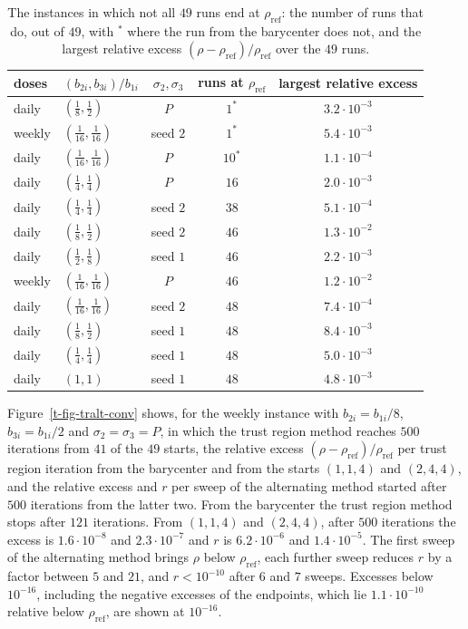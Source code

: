 \documentclass[11pt]{article}
\theoremstyle{plain}
\theoremstyle{definition}
\theoremstyle{remark}
\numberwithin{equation}{section}
\numberwithin{figure}{section}
\numberwithin{table}{section}
\numberwithin{algorithm}{section}
\begin{document}
\begin{table}[ht]
\centering
\small
\begin{tabular}{llccc}
\hline
doses & $(b_{2i},b_{3i})/b_{1i}$ & $\sigma_2,\sigma_3$ & runs at $\rho_{\mathrm{ref}}$ & largest relative excess\\
\hline
daily  & $(\tfrac18,\tfrac12)$       & $P$      & $1^*$  & $3.2\cdot 10^{-3}$\\
weekly & $(\tfrac1{16},\tfrac1{16})$ & seed $2$ & $1^*$  & $5.4\cdot 10^{-3}$\\
daily  & $(\tfrac1{16},\tfrac1{16})$ & $P$      & $10^*$ & $1.1\cdot 10^{-4}$\\
daily  & $(\tfrac14,\tfrac14)$       & $P$      & $16$   & $2.0\cdot 10^{-3}$\\
daily  & $(\tfrac14,\tfrac14)$       & seed $2$ & $38$   & $5.1\cdot 10^{-4}$\\
daily  & $(\tfrac18,\tfrac12)$       & seed $2$ & $46$   & $1.3\cdot 10^{-2}$\\
daily  & $(\tfrac12,\tfrac18)$       & seed $1$ & $46$   & $2.2\cdot 10^{-3}$\\
weekly & $(\tfrac1{16},\tfrac1{16})$ & $P$      & $46$   & $1.2\cdot 10^{-2}$\\
daily  & $(\tfrac1{16},\tfrac1{16})$ & seed $2$ & $48$   & $7.4\cdot 10^{-4}$\\
daily  & $(\tfrac18,\tfrac12)$       & seed $1$ & $48$   & $8.4\cdot 10^{-3}$\\
daily  & $(\tfrac14,\tfrac14)$       & seed $1$ & $48$   & $5.0\cdot 10^{-3}$\\
daily  & $(1,1)$                     & seed $1$ & $48$   & $4.8\cdot 10^{-3}$\\
\hline
\end{tabular}
\caption{The instances in which not all $49$ runs end at $\rho_{\mathrm{ref}}$:
the number of runs that do, out of $49$, with $^*$ where the run from the
barycenter does not, and the largest relative excess
$(\rho-\rho_{\mathrm{ref}})/\rho_{\mathrm{ref}}$ over the $49$
runs.}\label{t-tab-tralt-miss}
\end{table}

Figure~\ref{t-fig-tralt-conv} shows, for the weekly instance with
$b_{2i}=b_{1i}/8$, $b_{3i}=b_{1i}/2$ and $\sigma_2=\sigma_3=P$, in which the
trust region method reaches $500$ iterations from $41$ of the $49$ starts, the
relative excess $(\rho-\rho_{\mathrm{ref}})/\rho_{\mathrm{ref}}$ per trust
region iteration from the barycenter and from the starts $(1,1,4)$ and
$(2,4,4)$, and the relative excess and $r$ per sweep of the alternating method
started after $500$ iterations from the latter two. From the barycenter the
trust region method stops after $121$ iterations. From $(1,1,4)$ and $(2,4,4)$,
after $500$ iterations the excess is $1.6\cdot 10^{-8}$ and $2.3\cdot 10^{-7}$
and $r$ is $6.2\cdot 10^{-6}$ and $1.4\cdot 10^{-5}$. The first sweep of the
alternating method brings $\rho$ below $\rho_{\mathrm{ref}}$, each further
sweep reduces $r$ by a factor between $5$ and $21$, and $r<10^{-10}$ after $6$
and $7$ sweeps. Excesses below
$10^{-16}$, including the negative excesses of the endpoints, which lie
$1.1\cdot 10^{-10}$ relative below $\rho_{\mathrm{ref}}$, are shown at
$10^{-16}$.
\end{document}
